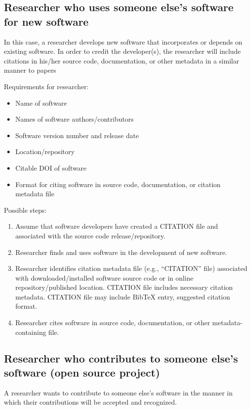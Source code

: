 \documentclass[12pt, oneside]{amsart}
\begin{document}
\subsection{Researcher who uses someone else's software for new software}

In this case, a researcher develops new software that incorporates or depends on existing software.
In order to credit the developer(s), the researcher will include citations in his/her source code, documentation, or other metadata in a similar manner to papers

Requirements for researcher:
\begin{itemize}
\item Name of software
\item Names of software authors/contributors
\item Software version number and release date
\item Location/repository
\item Citable DOI of software
\item Format for citing software in source code, documentation, or citation metadata file
\end{itemize}

Possible steps:
\begin{enumerate} \setcounter{enumi}{0}
\item Assume that software developers have created a CITATION file and associated with the source code release/repository.
\item Researcher finds and uses software in the development of new software.
\item Researcher identifies citation metadata file (e.g., ``CITATION'' file) associated with downloaded/installed software source code or in online repository/published location. CITATION file includes necessary citation metadata. CITATION file may include BibTeX entry, suggested citation format.
\item Researcher cites software in source code, documentation, or other metadata-containing file.
\end{enumerate}

\subsection{Researcher who contributes to someone else's software (open source project)}

A researcher wants to contribute to someone else's software in the manner in which their contributions will be accepted and recognized.
\end{document}
